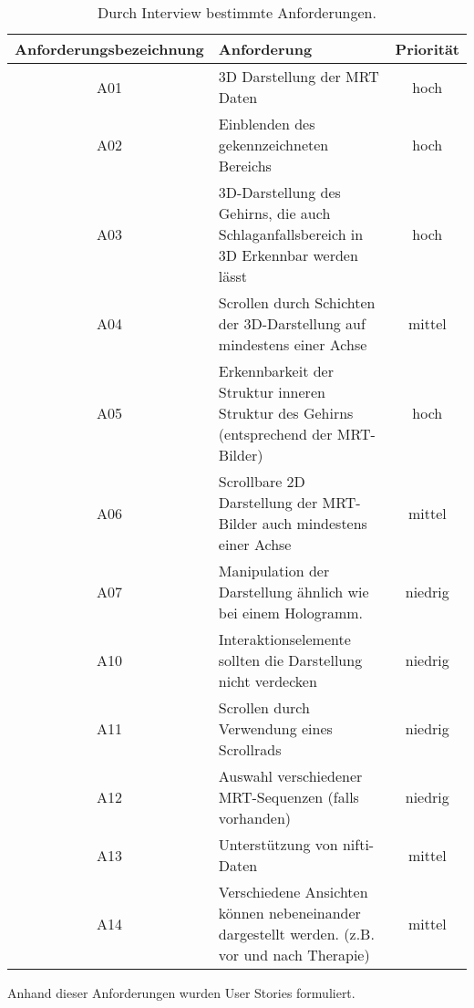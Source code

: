 \begin{table}
\begin{tabular}{|c|p{10cm}|c|}
\hline
Anforderungsbezeichnung & Anforderung & Priorität \\
\hline
A01 & 3D Darstellung der MRT Daten & hoch\\
\hline
A02 & Einblenden des gekennzeichneten Bereichs  & hoch\\
\hline
A03  & 3D-Darstellung des Gehirns, die auch Schlaganfallsbereich in 3D Erkennbar werden lässt  & hoch\\
\hline
A04 & Scrollen durch Schichten der 3D-Darstellung auf mindestens einer Achse& mittel\\
\hline
A05 & Erkennbarkeit der Struktur inneren Struktur des Gehirns (entsprechend der MRT-Bilder) & hoch\\
\hline
A06 & Scrollbare 2D Darstellung der MRT-Bilder auch mindestens einer Achse & mittel\\
\hline
A07 & Manipulation der Darstellung ähnlich wie bei einem Hologramm. & niedrig\\
\hline
A10 & Interaktionselemente sollten die Darstellung nicht verdecken & niedrig\\
\hline
A11 & Scrollen durch Verwendung eines Scrollrads & niedrig\\
\hline
A12 & Auswahl verschiedener MRT-Sequenzen (falls vorhanden) & niedrig\\
\hline
A13 & Unterstützung von nifti-Daten & mittel\\
\hline
A14 & Verschiedene Ansichten können nebeneinander dargestellt werden. (z.B. vor und nach Therapie) & mittel\\
\hline

\end{tabular}
\caption{\label{tab:table-name} Durch Interview bestimmte Anforderungen.}
\end{table}

Anhand dieser Anforderungen wurden User Stories formuliert. 

